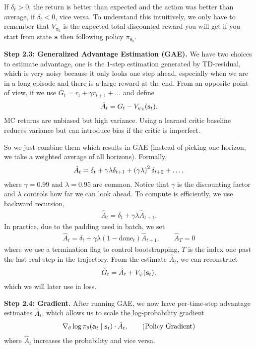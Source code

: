 \documentclass[11pt]{article}  %
\begin{document}
If $\delta_t > 0$, the return is better than expected and the action was better than average, if $\delta_t < 0$, vice versa.
To understand this intuitively, we only have to remember that $V_{\pi_k}$ is the expected total discounted reward you will get if you start from state $\mathbf{s}$ then following policy $\pi_{\theta_k}$.

\textbf{Step 2.3: Generalized Advantage Estimation (GAE).}
We have two choices to estimate advantage, one is the $1$-step estimation generated by TD-residual, which is very noisy because it only looks one step ahead, especially when we are in a long episode and there is a large reward at the end.
From an opposite point of view, if we use $G_t = r_t + \gamma r_{t+1} + \hdots$ and define 
\begin{align*}
  \hat{A}_t = G_t - V_{\psi_k}(\mathbf{s}_t).
\end{align*} 
MC returns are unbiased but high variance. Using a learned critic baseline reduces variance but can introduce bias if the critic is imperfect. 

So we just combine them which results in GAE (instead of picking one horizon, we take a weighted average of all horizons).
Formally, 
\begin{align*}
  \hat{A}_t = \delta_t + \gamma\lambda\delta_{t+1} + \left( \gamma\lambda \right)^2\delta_{t+2} + \hdots,
\end{align*}
where $\gamma = 0.99$ and $\lambda = 0.95$ are common.
Notice that $\gamma$ is the discounting factor and $\lambda$ controls how far we can look ahead.
To compute is efficiently, we use backward recursion,
\begin{align*}
  \hat{A}_t = \delta_t + \gamma\lambda\hat{A}_{t+1}.
\end{align*}
In practice, due to the padding used in batch, we set 
\begin{align}
  \hat{A}_t = \delta_t + \gamma\lambda(1 - \text{done}_t)\hat{A}_{t+1}, \qquad \hat{A}_T = 0
\end{align}
where we use a termination flag to control bootstrapping, $T$ is the index one past the last real step in the trajectory.
From the estimate $\hat{A}_t$, we can reconstruct 
\begin{align}
  \label{eq:GHAT}
  \hat{G}_t = \hat{A}_t + V_{\psi}(\mathbf{s}_t), 
\end{align}
which we will later use in loss.

\textbf{Step 2.4: Gradient.} After running GAE, we now have per-time-step advantage estimates $\hat{A}_t$, which allows us to scale the log-probability gradient 
\begin{align}
  \label{eq:policy-grad}
  \nabla_{\theta} \log \pi_{\theta}(\mathbf{a}_t \mid \mathbf{s}_t) \cdot \hat{A}_t, \tag{Policy Gradient}
\end{align} 
where $\hat{A}_t$ increases the probability and vice versa.
\end{document}

